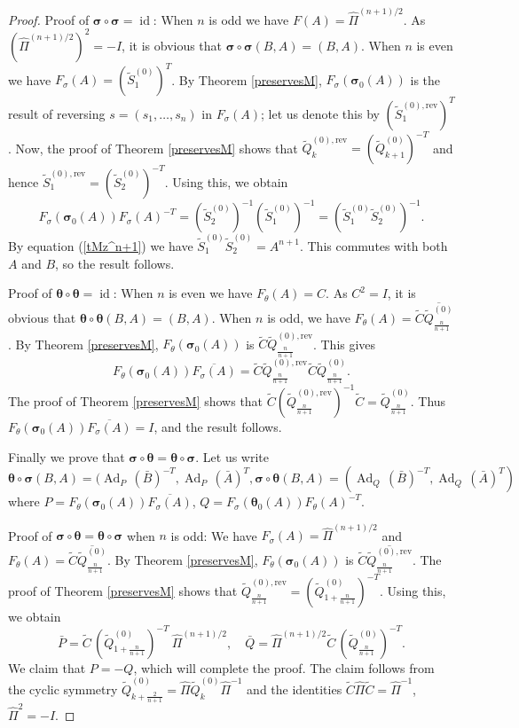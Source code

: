 \documentclass[a4paper,12pt,leqno]{amsart}
\numberwithin{equation}{section}
\theoremstyle{plain}
\theoremstyle{definition}
\newcommand{\si}{\sigma}
\renewcommand{\th}{\theta}
\DeclareMathOperator{\id}{id}
\DeclareMathOperator{\Ad}{Ad}
\newcommand{\tSz}{  \tilde S^{(0)}  }
\newcommand{\tQz}{  \tilde Q^{(0)}  }
\newcommand{\tC}{  \tilde C }
\newcommand{\bsi}{\boldsymbol\si}
\newcommand{\bth}{\boldsymbol\th}
\newcommand{\FA}{ F(A) }
\newcommand{\phn}{ \hat\Pi^{(n+1)/2}  }
\newcommand{\tQzr}{  \tilde Q^{(0),\text{rev}}  }
\newcommand{\tSzr}{  \tilde S^{(0),\text{rev}}  }
\begin{document}
\begin{proof}
Proof of $\bsi\circ\bsi=\id$:
When $n$ is odd we have $\FA=\phn$. As $(\phn)^2=-I$, it is obvious that
$\bsi\circ\bsi(B,A)=(B,A)$.
When $n$ is even we have $F_\si(A)=(\tSz_1)^T$.
By Theorem \ref{preservesM},
$F_\si(\bsi_0(A))$ is the result of reversing $s=(s_1,\dots,s_n)$ in $F_\si(A)$;
let us denote this by $(\tSzr_1)^T$.
Now, the proof of Theorem \ref{preservesM} shows that
$
\tQzr_{k } = (\tQz_{k+1})^{-T}
$
and hence
$
\tSzr_{1} = (\tSz_{2})^{-T}.
$
Using this, we obtain
\[
F_\si(\bsi_0(A)) F_\si(A)^{-T} = (\tSz_{2})^{-1} (\tSz_{1})^{-1} = (\tSz_{1} \tSz_{2})^{-1}.
\]
By equation (\ref{tMz^n+1}) we have
$\tSz_1 \tSz_2=A^{n+1}$. This commutes with both $A$ and $B$, so the result follows.

Proof of $\bth\circ\bth=\id$: When $n$ is even we have $F_\th(A)=C$. As $C^2=I$, it is obvious that
$\bth\circ\bth(B,A)=(B,A)$.
When $n$ is odd, we have $F_\th(A)=
\tC \overline{\tQz_{{\scriptstyle\frac{n}{n+1}} } }$. By Theorem \ref{preservesM},
$F_\th(\bsi_0(A))$ is $\tC \tQzr_{{\scriptstyle\frac{n}{n+1}} }$. This gives
\[
F_\th(\bsi_0(A)) \overline{F_\si(A)} = \tC \tQzr_{{\scriptstyle\frac{n}{n+1}} }
\tC \tQz_{{\scriptstyle\frac{n}{n+1}} }.
\]
The proof of Theorem \ref{preservesM} shows that
$\tC
\left(
\tQzr_{ \scriptstyle\frac{n}{n+1}}
\right)^{-1}
\tC
=
\tQz_{  \scriptstyle\frac{n}{n+1} }.
$
Thus $F_\th(\bsi_0(A)) \overline{F_\si(A)}=I$, and the result follows.

Finally we prove that $\bsi\circ\bth=\bth\circ\bsi$. Let us write
\[
\bth\circ\bsi(B,A)= (\Ad_P \, (\bar B)^{-T} \!, \Ad_P \, (\bar A)^{T} \!,
\bsi\circ\bth(B,A)= (\Ad_Q \, (\bar B)^{-T} \!, \Ad_Q\,  (\bar A)^{T})
\]
where
$
P=F_\th(\bsi_0(A)) \overline{F_\si(A)}
$,
$
Q= F_\si(\bth_0(A)) F_\th(A)^{-T}
$.

Proof of $\bsi\circ\bth=\bth\circ\bsi$ when $n$ is odd: We have $F_\si(A)=\phn$ and $F_\th(A)=
\tC \overline{\tQz_{{\scriptstyle\frac{n}{n+1}} } }$. By Theorem \ref{preservesM},
$F_\th(\bsi_0(A))$ is $\tC \overline{\tQzr_{{\scriptstyle\frac{n}{n+1}} } }$.
The proof of Theorem \ref{preservesM} shows that
$
\tQzr_{{\scriptstyle\frac{n}{n+1}} } = (\tQz_{{\scriptstyle 1+\frac{n}{n+1}} })^{-T}.
$
Using this, we obtain
\[
\bar P= \tC \, (\tQz_{{\scriptstyle 1+\frac{n}{n+1}} })^{-T} \ \phn,\quad
\bar Q= \phn \tC \, (\tQz_{{\scriptstyle \frac{n}{n+1}} })^{-T}.
\]
We claim that $P=-Q$, which will complete the proof.  The claim follows from the cyclic symmetry
$\tQz_{k+\scriptstyle\frac2{n+1}} = \hat\Pi \tQz_k \hat\Pi^{-1}$ and the
identities
$\tC \hat\Pi \tC=\hat\Pi^{-1}$, $\hat\Pi^2=-I$.


\end{proof}
\end{document}
